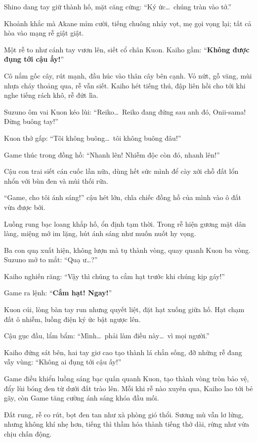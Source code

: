 \documentclass[../main.tex]{subfiles}
\begin{document}
Shino dang tay giữ thành hố, mặt căng cứng: ``Ký ức\dots\ chúng tràn vào tớ.''

Khoảnh khắc mà Akane mỉm cười, tiếng chuông nhảy vọt, mẹ gọi vọng lại; tất cả hòa vào mạng rễ giật giật.

Một rễ to như cánh tay vươn lên, siết cổ chân Kuon. Kaiho gầm: ``\textbf{Không được đụng tới cậu ấy!}''

Cô nắm gốc cây, rút mạnh, đầu húc vào thân cây bên cạnh. Vỏ nứt, gỗ văng, mùi nhựa cháy thoảng qua, rễ vẫn siết. Kaiho hét tiếng thú, đập liên hồi cho tới khi nghe tiếng rách khô, rễ đứt lìa.

Suzuno ôm vai Kuon kéo lùi: ``Reiko\dots\ Reiko đang đứng sau anh đó, Onii-sama! Đừng buông tay!''

Kuon thở gấp: ``Tôi không buông\dots\ tôi không buông đâu!''

Game thúc trong đồng hồ: ``Nhanh lên! Nhiễm độc còn đó, nhanh lên!''

Cậu con trai siết cán cuốc lần nữa, dùng hết sức mình để cày xới chỗ đất lổn nhổn với bùn đen và mùi thối rữa.

``Game, cho tôi ánh sáng!'' cậu hét lớn, chĩa chiếc đồng hồ của mình vào ô đất vừa được bới.

Luồng rung bạc loang khắp hố, ổn định tạm thời. Trong rễ hiện gương mặt dân làng, miệng mở im lặng, hút ánh sáng như muốn nuốt hy vọng.

Ba con quạ xuất hiện, không lượn mà tụ thành vòng, quay quanh Kuon ba vòng. Suzuno mở to mắt: ``Quạ ư\dots?''

Kaiho nghiến răng: ``Vậy thì chúng ta cắm hạt trước khi chúng kịp gáy!''

Game ra lệnh: ``\textbf{Cắm hạt! Ngay!}''

Kuon cúi, lòng bàn tay run nhưng quyết liệt, đặt hạt xuống giữa hố. Hạt chạm đất ô nhiễm, luồng điện ký ức bật ngược lên.

Cậu gục đầu, lẩm bẩm: ``Mình\dots\ phải làm điều này\dots\ vì mọi người.''

Kaiho đứng sát bên, hai tay giơ cao tạo thành lá chắn sống, đỡ những rễ đang vẫy vùng: ``Không ai đụng tới cậu ấy!''

Game điều khiển luồng sáng bạc quấn quanh Kuon, tạo thành vòng tròn bảo vệ, đẩy lùi bóng đen từ dưới đất trào lên. Mỗi khi rễ nào xuyên qua, Kaiho lao tới bẻ gãy, còn Game tăng cường ánh sáng khóa đầu mối.

Đất rung, rễ co rút, bọt đen tan như xà phòng gió thổi. Sương mù vẫn lơ lửng, nhưng không khí nhẹ hơn, tiếng thì thầm hóa thành tiếng thở dài, rừng như vừa chịu chấn động.
\end{document}
